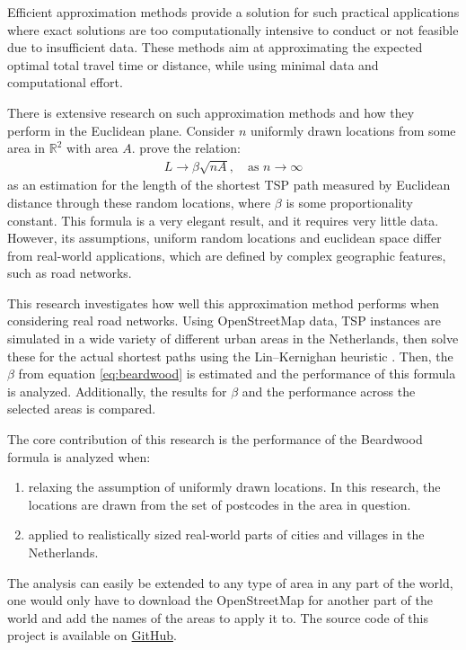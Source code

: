 \documentclass[12pt]{article}
\numberwithin{equation}{section}
\newcommand{\1}[1]{\,I_{#1}} %
\begin{document}
Efficient approximation methods provide a solution for such practical applications where exact
solutions are too computationally intensive to conduct or not feasible due to insufficient data.
These methods aim at approximating the expected optimal total travel time or distance, while using
minimal data and computational effort.

There is extensive research on such approximation methods and how they perform in the Euclidean
plane.
Consider $n$ uniformly drawn locations from some area in $\mathbb{R}^2$ with area $A$.
\citet{beardwood1959shortest} prove the relation:
\begin{align}
	L \to \beta \sqrt{nA}, \quad \text{as } n \to \infty
	\label{eq:beardwood}
\end{align}
as an estimation for the length of the shortest TSP path measured by Euclidean distance through
these random locations, where $\beta$ is some proportionality constant. This formula is a very
elegant result, and it requires very little data. However, its assumptions,
uniform random locations and euclidean space differ from real-world applications, which are defined
by complex geographic features, such as road networks.

This research investigates how well this approximation method performs when considering real road
networks. Using OpenStreetMap \citep{openstreetmap} data, TSP instances are simulated in a wide variety of different urban areas
in the Netherlands, then solve these for the actual shortest paths using the Lin–Kernighan heuristic
\citep{lin1973effective}.
Then, the $\beta$ from equation \ref{eq:beardwood} is estimated and the performance of this
formula is analyzed. Additionally, the results for $\beta$ and the performance across the selected
areas is compared. 

The core contribution of this research is the performance of the Beardwood formula is analyzed when: 
\begin{enumerate}
  \item relaxing the assumption of uniformly drawn locations. In this research,
	the locations are drawn from the set of postcodes in the area in question.
  \item applied to realistically sized real-world parts of cities and villages in the Netherlands.
\end{enumerate}
The analysis can easily be extended to any type of area in any part of the world, one would only
have to download the OpenStreetMap \citep{openstreetmap} for another part of the world and add the names of the areas
to apply it to. The source code of this project is available on 
\href{https://github.com/koen1859/Scriptie}{GitHub}.
\end{document}
